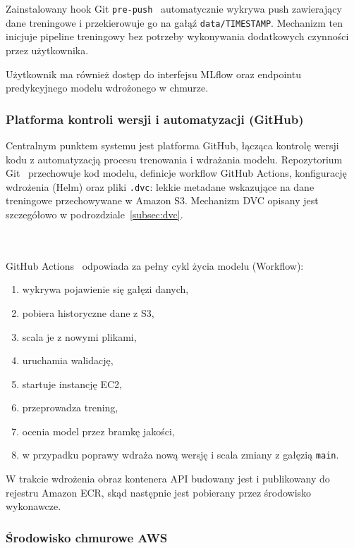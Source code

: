 Zainstalowany hook Git \texttt{pre-push}~\cite{chacon2014pro_git} automatycznie wykrywa push zawierający dane treningowe i przekierowuje go na gałąź \texttt{data/TIMESTAMP}. Mechanizm ten inicjuje pipeline treningowy bez potrzeby wykonywania dodatkowych czynności przez użytkownika.

Użytkownik ma również dostęp do interfejsu MLflow oraz endpointu predykcyjnego modelu wdrożonego w chmurze.

\vspace{10px}

\subsubsection{Platforma kontroli wersji i automatyzacji (GitHub)}

  Centralnym punktem systemu jest platforma GitHub, łącząca kontrolę wersji kodu z automatyzacją procesu trenowania i wdrażania modelu.
  Repozytorium Git~\cite{chacon2014pro_git} przechowuje kod modelu, definicje workflow GitHub Actions, konfigurację wdrożenia (Helm) oraz pliki \texttt{.dvc}: lekkie metadane wskazujące na dane treningowe przechowywane w Amazon S3. Mechanizm DVC opisany jest szczegółowo w podrozdziale~\ref{subsec:dvc}.

\noindent\mbox{}\\\\ GitHub Actions~\cite{github_actions_docs} odpowiada za pełny cykl życia modelu (Workflow):

\begin{enumerate}
    \item wykrywa pojawienie się gałęzi danych,
    \item pobiera historyczne dane z S3,
    \item scala je z nowymi plikami,
    \item uruchamia walidację,
    \item startuje instancję EC2,
    \item przeprowadza trening,
    \item ocenia model przez bramkę jakości,
    \item w przypadku poprawy wdraża nową wersję i scala zmiany z gałęzią \texttt{main}.
\end{enumerate}

W trakcie wdrożenia obraz kontenera API budowany jest i publikowany do rejestru Amazon ECR, skąd następnie jest pobierany przez środowisko wykonawcze.

\subsubsection{Środowisko chmurowe AWS}

